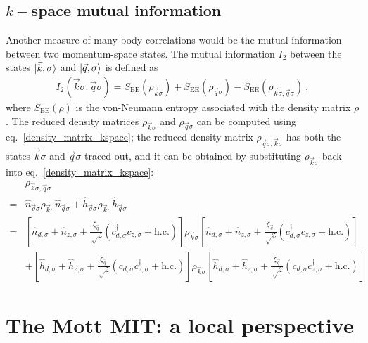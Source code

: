 \documentclass[reprint,hidelinks]{revtex4-2}
\begin{document}
\subsection{\(k-\)space mutual information}
Another measure of many-body correlations would be the mutual information between two momentum-space states. The mutual information \(I_2\) between the states \(\ket{\vec k, \sigma}\) and \(\ket{\vec q, \sigma}\) is defined as
\begin{equation}\begin{aligned}
	I_2(\vec k\sigma:\vec q\sigma) = S_\text{EE}(\rho_{\vec k\sigma}) + S_\text{EE}(\rho_{\vec q\sigma}) - S_\text{EE}(\rho_{\vec k\sigma, \vec q\sigma})~,
\end{aligned}\end{equation}
where \(S_\text{EE}(\rho)\) is the von-Neumann entropy associated with the density matrix \(\rho\). The reduced density matrices \(\rho_{\vec k\sigma}\) and \(\rho_{\vec q\sigma}\) can be computed using eq.~\ref{density_matrix_kspace}; the reduced density matrix \(\rho_{\vec q\sigma, \vec k\sigma}\) has both the states \(\vec k\sigma\) and \(\vec q\sigma\) traced out, and it can be obtained by substituting \(\rho_{\vec k\sigma}\) back into eq.~\ref{density_matrix_kspace}:
\begin{equation}\begin{aligned}
	&\rho_{\vec k\sigma, \vec q\sigma} \\
	=& \hat n_{\vec q\sigma}\rho_{\vec k\sigma}\hat n_{\vec q\sigma} + \hat h_{\vec q\sigma}\rho_{\vec k\sigma}\hat h_{\vec q\sigma}\\
	=& \left[\hat n_{d,\sigma} + \hat n_{z,\sigma} + \frac{\xi_{\vec q}}{\sqrt \mathcal{Z}}\left(c^\dagger_{d,\sigma}c_{z,\sigma} + \text{h.c.} \right)\right] \rho_{\vec k\sigma} \left[\hat n_{d,\sigma} + \hat n_{z,\sigma} + \frac{\xi_{\vec q}}{\sqrt \mathcal{Z}}\left(c^\dagger_{d,\sigma}c_{z,\sigma} + \text{h.c.} \right)\right]\\
				  &+ \left[\hat h_{d,\sigma} + \hat h_{z,\sigma} + \frac{\xi_{\vec q}}{\sqrt \mathcal{Z}}\left(c_{d,\sigma}c^\dagger_{z,\sigma} + \text{h.c.} \right)\right] \rho_{\vec k\sigma} \left[\hat h_{d,\sigma} + \hat h_{z,\sigma} + \frac{\xi_{\vec q}}{\sqrt \mathcal{Z}}\left(c_{d,\sigma}c^\dagger_{z,\sigma} + \text{h.c.} \right)\right]
\end{aligned}\end{equation}


\section{The Mott MIT: a local perspective}
\end{document}
